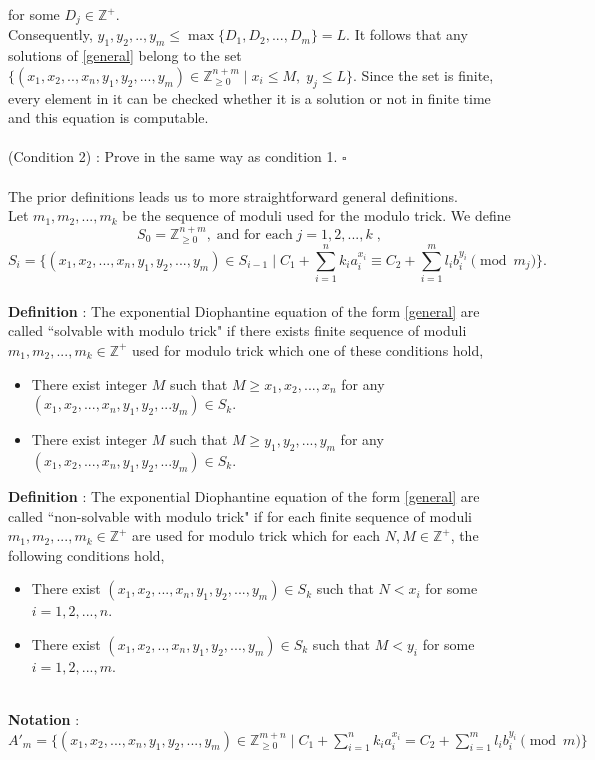 \documentclass[12pt]{article}
\begin{document}
for some $D_j\in \mathbb{Z}^{+}$. \\
Consequently, $y_1,y_2,..,y_m \leq \max \{D_1, D_2, ..., D_m\} =L$. 
It follows that any solutions of \eqref{general} belong to the set $\{(x_1,x_2,..,x_n,y_1,y_2,...,y_m) \in \mathbb{Z}_{\geq0}^{n+m}\; | \; x_i \leq M, \; y_j \leq L \}$. Since the set is finite, every element in it can be checked whether it is a solution or not in finite time and this equation is computable.\\
\\
(Condition 2) : Prove in the same way as condition 1. $\square$\\
\\
\hspace*{0.5cm}The prior definitions leads us to more straightforward general definitions. \\
Let $m_1,m_2,...,m_k$ be the sequence of moduli used for the modulo trick. We define
\[S_0 = \mathbb{Z}_{\geq 0}^{n+m}, \; \text{and for each} \; j=1,2,..., k \;,\]
\[S_i = \{(x_1, x_2,..., x_n, y_1, y_2,..., y_m) \in S_{i-1} \;| \;  C_1+ \sum_{i=1}^nk_ia_i^{x_i} \equiv C_2 + \sum_{i=1}^ml_ib_i^{y_i} \pmod {m_j} \}.\]
\\
\textbf{Definition} : The exponential Diophantine equation of the form \eqref{general} are called ``solvable with modulo trick" if there exists finite sequence of moduli $m_1, m_2,..., m_k \in \mathbb{Z}^{+}$ used for modulo trick which one of these conditions hold,
\begin{itemize}
    \item There exist integer $M$ such that $M \geq x_1, x_2,..., x_n$ for any $(x_1, x_2,..., x_n, y_1, y_2,... y_m) \in S_k$.
    \item There exist integer $M$ such that $M \geq  y_1, y_2,...,y_m $ for any $(x_1, x_2,..., x_n, y_1, y_2,... y_m) \in S_k$.
\end{itemize} 

\textbf{Definition} : The exponential Diophantine equation of the form \eqref{general} are called ``non-solvable with modulo trick" if for each finite sequence of moduli $m_1, m_2,...,m_k \in \mathbb{Z}^{+}$ are used for modulo trick which for each $N,M \in \mathbb{Z}^{+}$, the following conditions hold,
\begin{itemize}
    \item There exist $(x_1, x_2,...,x_n,y_1,y_2,...,y_m) \in S_k$ such that $N < x_i$ for some $i=1,2,...,n$.
    \item There exist $(x_1,x_2,..,x_n,y_1,y_2,...,y_m) \in S_k$ such that $M < y_i$ for some $i=1,2,...,m$.
\end{itemize}\\
\textbf{Notation} : $A'_m  = \{(x_1,x_2,...,x_n,y_1,y_2,...,y_m) \in \mathbb{Z}_{\geq 0}^{m+n} \;|\; C_1+ \sum_{i=1}^nk_ia_i^{x_i} = C_2 + \sum_{i=1}^ml_ib_i^{y_i} \pmod m\} $ \\
\end{document}
